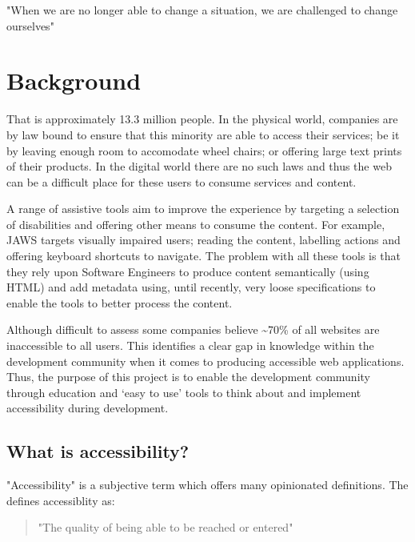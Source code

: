 \begin{savequote}[75mm]
"When we are no longer able to change a situation, we are challenged to
change ourselves"
\end{savequote}

\chapter{Background}
That is approximately 13.3 million people. In the physical world,
companies are by law
bound \citep{DDA} to ensure that this minority are able to access their services; be it by
leaving enough room to accomodate wheel chairs; or offering large text prints
of their products. In the digital world there are no such laws and thus the web can be a
difficult place for these users to consume services and content.

A range of assistive
tools aim to improve the experience by targeting a selection of
disabilities and offering other means to consume the content. For example,
JAWS \citep{JAWS} targets visually impaired users; reading the content,
labelling actions and offering keyboard shortcuts to navigate. The
problem
with all these tools is that they rely upon Software Engineers to produce
content semantically (using HTML) and add metadata using, until recently,
very loose specifications \citep{WCAG} to enable the tools to better process
the content.

Although difficult to assess some companies \citep{Slate}
\citep{SightAndSound} believe \textasciitilde70\% of all websites are
inaccessible to all users. This identifies a clear gap in knowledge within
the development community when it comes to producing accessible web
applications. Thus, the purpose of this project is to enable the development
community through education and `easy to use' tools to think about and
implement accessibility during development.

\section{What is accessibility?}
"Accessibility" is a subjective term which offers many opinionated
definitions. The \cite*{OxDict} defines accessiblity as:
\begin{quote}
"The quality of being able to be reached or entered"
\end{quote}

